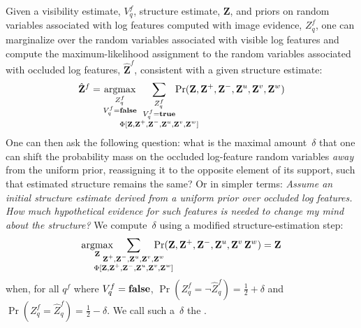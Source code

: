 Given a visibility estimate, $V^f_q$, structure estimate, $\mathbf{Z}$, and
priors on random variables associated with log features computed with
image evidence, $Z^f_q$, one can marginalize over the random variables
associated with visible log features and compute the maximum-likelihood
assignment to the random variables associated with occluded log features,
$\hat{\mathbf{Z}}^f$, consistent with a given structure estimate:
%
\begin{equation*}
  \hat{\mathbf{Z}}^f=
  \argmax_{\substack{Z^f_q\\V^f_q=\false}}\hspace{-4.5ex}
  \sum_{\substack{Z^f_q\\V^f_q=\true\\
      \Phi[\mathbf{Z},\mathbf{Z}^{+},\mathbf{Z}^{-},\mathbf{Z}^u,\mathbf{Z}^v,\mathbf{Z}^w]}}\hspace{-6ex}
  \Pr(\mathbf{Z},\mathbf{Z}^{+},\mathbf{Z}^{-},\mathbf{Z}^u,\mathbf{Z}^v,\mathbf{Z}^w)
\end{equation*}
%
One can then ask the following question: what is the maximal amount~$\delta$
that one can shift the probability mass on the occluded log-feature random
variables \emph{away} from the uniform prior, reassigning it to the opposite
element of its support, such that estimated structure remains the same?
%
Or in simpler terms: \emph{Assume an initial structure estimate derived from a
  uniform prior over occluded log features.
  How much hypothetical evidence for such features is needed to change my mind
  about the structure?}
%
We compute~$\delta$ using a modified structure-estimation step:
%
\begin{equation*}
  \argmax_{\mathbf{Z}}\hspace{-5ex}
  \sum_{\substack{\mathbf{Z}^{+},\mathbf{Z}^{-},\mathbf{Z}^u,\mathbf{Z}^v,\mathbf{Z}^w\\
      \Phi[\mathbf{Z},\mathbf{Z}^{+},\mathbf{Z}^{-},\mathbf{Z}^u,\mathbf{Z}^v,\mathbf{Z}^w]}}\hspace{-5ex}
  \Pr(\mathbf{Z},\mathbf{Z}^{+},\mathbf{Z}^{-},\mathbf{Z}^u,\mathbf{Z}^v\,\mathbf{Z}^w)=\mathbf{Z}
\end{equation*}
%
when, for all $q^f$ where $V^f_q=\mathbf{false}$,
%
\begin{math}
    \Pr(Z^f_q=\neg\hat{Z}^f_q)=\frac{1}{2}+\delta
\end{math}
and
\begin{math}
    \Pr(Z^f_q=\hat{Z}^f_q)=\frac{1}{2}-\delta.
\end{math}
%
We call such a~$\delta$ the .
